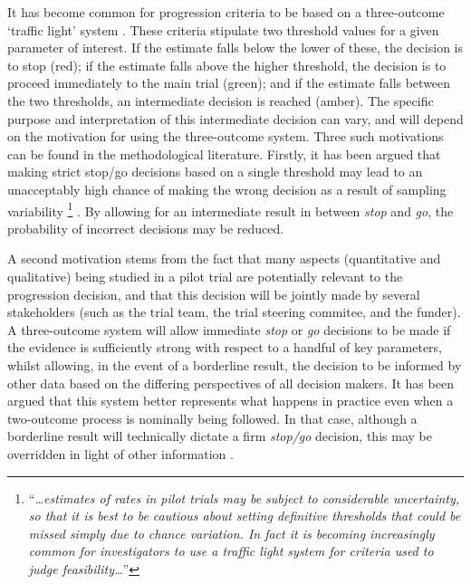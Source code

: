 \documentclass{bmcart}
\begin{document}
It has become common for progression criteria to be based on a three-outcome `traffic light' system \cite{Avery2017}. These criteria stipulate two threshold values for a given parameter of interest. If the estimate falls below the lower of these, the decision is to stop (red); if the estimate falls above the higher threshold, the decision is to proceed immediately to the main trial (green); and if the estimate falls between the two thresholds, an intermediate decision is reached (amber). The specific purpose and interpretation of this intermediate decision can vary, and will depend on the motivation for using the three-outcome system. Three such motivations can be found in the methodological literature. Firstly, it has been argued that making strict stop/go decisions based on a single threshold  may lead to an unacceptably high chance of making the wrong decision as a result of sampling variability \footnote{``\emph{\ldots estimates of rates in pilot trials may be subject to considerable uncertainty, so that it is best to be cautious about setting definitive thresholds that could be missed simply due to chance variation. In fact it is becoming increasingly common for investigators to use a traffic light system for criteria used to judge feasibility\ldots}''} \cite{Eldridge2016a}. By allowing for an intermediate result in between \emph{stop} and \emph{go}, the probability of incorrect decisions may be reduced.


A second motivation stems from the fact that many aspects (quantitative and qualitative) being studied in a pilot trial are potentially relevant to the progression decision, and that this decision will be jointly made by several stakeholders (such as the trial team, the trial steering commitee, and the funder). A three-outcome system will allow immediate \emph{stop} or \emph{go} decisions to be made if the evidence is sufficiently strong with respect to a handful of key parameters, whilst allowing, in the event of a borderline result, the decision to be informed by other data based on the differing perspectives of all decision makers. It has been argued that this system better represents what happens in practice even when a two-outcome process is nominally being followed. In that case, although a borderline result will technically dictate a firm \emph{stop/go} decision, this may be overridden in light of other information \cite{Sargent2001}.
\end{document}
